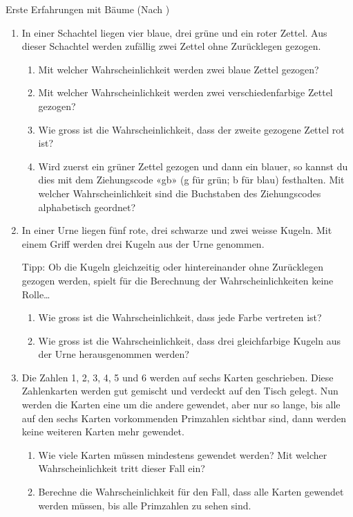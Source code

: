 \begin{ueb}
  {Erste Erfahrungen mit Bäume (Nach )}{}

  \begin{enumerate}
    \item In einer Schachtel liegen vier blaue, drei grüne und ein roter Zettel. Aus dieser Schachtel werden zufällig zwei Zettel ohne Zurücklegen gezogen.
          \begin{enumerate}
            \item Mit welcher Wahrscheinlichkeit werden zwei blaue Zettel gezogen?
            \item Mit welcher Wahrscheinlichkeit werden zwei verschiedenfarbige Zettel gezogen?
            \item Wie gross ist die Wahrscheinlichkeit, dass der zweite gezogene Zettel rot ist?
            \item Wird zuerst ein grüner Zettel gezogen und dann ein blauer, so kannst du dies mit dem Ziehungscode «gb» (g für grün; b für blau) festhalten. Mit welcher Wahrscheinlichkeit sind die Buchstaben des Ziehungscodes alphabetisch geordnet?
          \end{enumerate}

    \item In einer Urne liegen fünf rote, drei schwarze und zwei weisse Kugeln. Mit einem Griff werden drei Kugeln aus der Urne genommen.

          Tipp: Ob die Kugeln gleichzeitig  oder hintereinander ohne Zurücklegen gezogen werden, spielt für die Berechnung der Wahrscheinlichkeiten keine Rolle\dots
          \begin{enumerate}
            \item Wie gross ist die Wahrscheinlichkeit, dass jede Farbe vertreten ist?
            \item Wie gross ist die Wahrscheinlichkeit, dass drei gleichfarbige Kugeln aus der Urne herausgenommen werden?
          \end{enumerate}

    \item Die Zahlen 1, 2, 3, 4, 5 und 6 werden auf sechs Karten geschrieben. Diese Zahlenkarten werden gut gemischt und verdeckt auf den Tisch gelegt. Nun werden die Karten eine um die andere gewendet, aber nur so lange, bis alle auf den sechs Karten vorkommenden Primzahlen sichtbar sind, dann werden keine weiteren Karten mehr gewendet.
          \begin{enumerate}
            \item Wie viele Karten müssen mindestens gewendet werden? Mit welcher Wahrscheinlichkeit tritt dieser Fall ein?
            \item Berechne die Wahrscheinlichkeit für den Fall, dass alle Karten gewendet werden müssen, bis alle Primzahlen zu sehen sind.
          \end{enumerate}


\end{enumerate}
\end{ueb}
